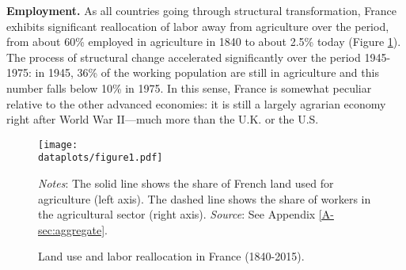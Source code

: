 \documentclass[./20250130-paper.tex]{subfiles}
\begin{document}
\textbf{Employment.} As all countries going through structural transformation, France exhibits significant reallocation of labor away from agriculture over the period, from about 60\% employed in agriculture in 1840 to about 2.5\% today (Figure \ref{fig:share_landlabor}). The process of structural change accelerated significantly over the period 1945-1975: in 1945, 36\% of the working population are still in agriculture and this number falls below 10\% in 1975. In this sense, France is somewhat peculiar relative to the other advanced economies: it is still a largely agrarian economy right after World War II---much more than the U.K. or the U.S.

\begin{figure}[h!]	
	\begin{center}
		\texttt{[image: \\dataplots/figure1.pdf]}
	\end{center}
	\vspace{-0.5cm}
	\caption{Land use and labor reallocation in France (1840-2015).\label{fig:share_landlabor}
	}
	{\footnotesize \textit{Notes}: The solid line shows the share of French land used for agriculture (left axis). The dashed line shows the share of workers in the agricultural sector (right axis).
		\textit{Source}: See Appendix \ref{A-sec:aggregate}.}
\end{figure}


\end{document}
